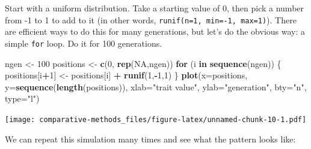 \documentclass[]{article}
\newenvironment{Shaded}{\begin{snugshade}}{\end{snugshade}}
\newcommand{\ControlFlowTok}[1]{\textcolor[rgb]{0.13,0.29,0.53}{\textbf{#1}}}
\newcommand{\DataTypeTok}[1]{\textcolor[rgb]{0.13,0.29,0.53}{#1}}
\newcommand{\DecValTok}[1]{\textcolor[rgb]{0.00,0.00,0.81}{#1}}
\newcommand{\KeywordTok}[1]{\textcolor[rgb]{0.13,0.29,0.53}{\textbf{#1}}}
\newcommand{\NormalTok}[1]{#1}
\newcommand{\OperatorTok}[1]{\textcolor[rgb]{0.81,0.36,0.00}{\textbf{#1}}}
\newcommand{\OtherTok}[1]{\textcolor[rgb]{0.56,0.35,0.01}{#1}}
\newcommand{\StringTok}[1]{\textcolor[rgb]{0.31,0.60,0.02}{#1}}
\theoremstyle{definition}
\theoremstyle{definition}
\theoremstyle{definition}
\theoremstyle{remark}
\begin{document}
Start with a uniform distribution. Take a starting value of 0, then pick
a number from -1 to 1 to add to it (in other words,
\texttt{runif(n=1,\ min=-1,\ max=1)}). There are efficient ways to do
this for many generations, but let's do the obvious way: a simple
\texttt{for} loop. Do it for 100 generations.

\begin{Shaded}
\begin{Highlighting}[]
\NormalTok{ngen <-}\StringTok{ }\DecValTok{100}
\NormalTok{positions <-}\StringTok{ }\KeywordTok{c}\NormalTok{(}\DecValTok{0}\NormalTok{, }\KeywordTok{rep}\NormalTok{(}\OtherTok{NA}\NormalTok{,ngen))}
\ControlFlowTok{for}\NormalTok{ (i }\ControlFlowTok{in} \KeywordTok{sequence}\NormalTok{(ngen)) \{}
\NormalTok{  positions[i}\OperatorTok{+}\DecValTok{1}\NormalTok{] <-}\StringTok{ }\NormalTok{positions[i] }\OperatorTok{+}\StringTok{ }\KeywordTok{runif}\NormalTok{(}\DecValTok{1}\NormalTok{,}\OperatorTok{-}\DecValTok{1}\NormalTok{,}\DecValTok{1}\NormalTok{)}
\NormalTok{\}}
\KeywordTok{plot}\NormalTok{(}\DataTypeTok{x=}\NormalTok{positions, }\DataTypeTok{y=}\KeywordTok{sequence}\NormalTok{(}\KeywordTok{length}\NormalTok{(positions)), }\DataTypeTok{xlab=}\StringTok{"trait value"}\NormalTok{, }\DataTypeTok{ylab=}\StringTok{"generation"}\NormalTok{, }\DataTypeTok{bty=}\StringTok{"n"}\NormalTok{, }\DataTypeTok{type=}\StringTok{"l"}\NormalTok{)}
\end{Highlighting}
\end{Shaded}

\texttt{[image: comparative-methods\_files/figure-latex/unnamed-chunk-10-1.pdf]}

We can repeat this simulation many times and see what the pattern looks
like:
\end{document}
